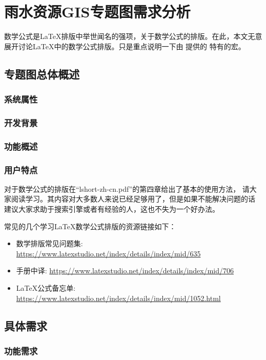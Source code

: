 \chapter{雨水资源GIS专题图需求分析}

数学公式是\LaTeX{}排版中举世闻名的强项，关于数学公式的排版。在此，本文无意
展开讨论\LaTeX{}中的数学公式排版。只是重点说明一下由 \nwafuthesis{} 提供的
特有的宏。

\section{专题图总体概述}
\subsection{系统属性}
\subsection{开发背景}
\subsection{功能概述}
\subsection{用户特点}

对于数学公式的排版在\enquote{lshort-zh-cn.pdf}的第四章给出了基本的使用方法，
请大家阅读学习。其内容对大多数人来说已经足够用了，但是如果不能解决问题的话
建议大家求助于搜索引擎或者有经验的人，这也不失为一个好办法。

常见的几个学习\LaTeX{}数学公式排版的资源链接如下：

\begin{itemize}
  \item 数学排版常见问题集:
        \url{https://www.latexstudio.net/index/details/index/mid/635}
  \item {}手册中译:
        \url{https://www.latexstudio.net/index/details/index/mid/706}
  \item \LaTeX{}公式备忘单:
        \url{https://www.latexstudio.net/index/details/index/mid/1052.html}
\end{itemize}

\section{具体需求}
\subsection{功能需求}
